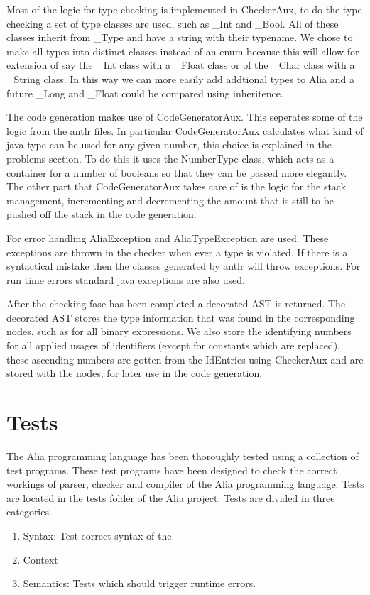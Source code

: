 \documentclass[paper=a4, fontsize=11pt]{article}
\numberwithin{equation}{section}		%
\numberwithin{figure}{section}			%
\numberwithin{table}{section}				%
\begin{document}
Most of the logic for type checking is implemented in CheckerAux, to do the type checking a set of type classes are used, such as \_Int and \_Bool. All of these classes inherit from \_Type and have a string with their typename. We chose to make all types into distinct classes instead of an enum because this will allow for extension of say the \_Int class with a \_Float class or of the \_Char class with a \_String class. In this way we can more easily add addtional types to Alia and a future \_Long and \_Float could be compared using inheritence.

The code generation makes use of CodeGeneratorAux. This seperates some of the logic from the antlr files. In particular CodeGeneratorAux calculates what kind of java type can be used for any given number, this choice is explained in the problems section. To do this it uses the NumberType class, which acts as a container for a number of booleans so that they can be passed more elegantly. The other part that CodeGeneratorAux takes care of is the logic for the stack management, incrementing and decrementing the amount that is still to be pushed off the stack in the code generation.

For error handling AliaException and AliaTypeException are used. These exceptions are thrown in the checker when ever a type is violated. If there is a syntactical mistake then the classes generated by antlr will throw exceptions. For run time errors standard java exceptions are also used.

After the checking fase has been completed a decorated AST is returned. The decorated AST stores the type information that was found in the corresponding nodes, such as for all binary expressions. We also store the identifying numbers for all applied usages of identifiers (except for constants which are replaced), these ascending numbers are gotten from the IdEntries using CheckerAux and are stored with the nodes, for later use in the code generation.

\section{Tests}
The Alia programming language has been thoroughly tested using a collection of test programs. These test programs have been designed to check the correct workings of parser, checker and compiler of the Alia programming language. Tests are located in the tests folder of the Alia project. Tests are divided in three categories.

\begin{enumerate}
\item Syntax: Test correct syntax of the 
\item Context
\item Semantics: Tests which should trigger runtime errors.
\end{enumerate}
\end{document}
